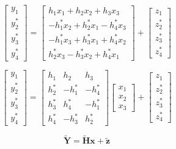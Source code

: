 \documentclass[fleqn]{article}
\begin{document}
\begin{enumerate}
\begin{enumerate}
			\begin{equation*}
				\begin{bmatrix}
					y_1 \\ y_2^* \\ y_3^* \\ y_4^*
				\end{bmatrix} = \begin{bmatrix}
					 h_1x_1   + h_2x_2   + h_3x_3 \\
					-h_1^*x_2 + h_2^*x_1 - h_4^*x_3 \\
					-h_1^*x_3 + h_3^*x_1 + h_4^*x_2 \\
					 h_2^*x_3 - h_3^*x_2 + h_4^*x_1
				\end{bmatrix} + \begin{bmatrix}
					z_1 \\ z_2^* \\ z_3^* \\ z_4^*
				\end{bmatrix}
			\end{equation*}
			
			\begin{equation*}
				\begin{bmatrix}
					y_1 \\ y_2^* \\ y_3^* \\ y_4^*
				\end{bmatrix} = \begin{bmatrix}
					h_1   &  h_2   &  h_3 \\
				    h_2^* & -h_1^* & -h_4^* \\
					h_3^* &  h_4^* & -h_1^* \\
					h_4^* & -h_3^* &  h_2^*
				\end{bmatrix} \begin{bmatrix}
					x_1 \\ x_2 \\ x_3
				\end{bmatrix} + \begin{bmatrix}
					z_1 \\ z_2^* \\ z_3^* \\ z_4^*
				\end{bmatrix}
			\end{equation*}
			
			\begin{equation*}
				\mathbf{\tilde{Y}} = \mathbf{\tilde{H}x} + \mathbf{\tilde{z}}
			\end{equation*}
			

\end{enumerate}
\end{enumerate}
\end{document}
